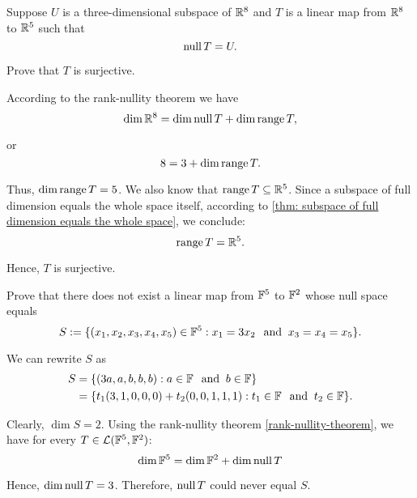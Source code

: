 \begin{xrcs}
  Suppose $U$ is a three-dimensional subspace of $\mathbb{R}^8$ and $T$ is a linear map from $\mathbb{R}^8$ to $\mathbb{R}^5$ such that
  \begin{equation}
    \operatorname{null} T = U.
  \end{equation}

  Prove that $T$ is surjective.

  \begin{xprf}
    According to the rank-nullity theorem we have
    \begin{equation}
        \dim \mathbb{R}^8 = \dim \operatorname{null} T + \dim \operatorname{range} T,
    \end{equation}

    or
    \begin{equation}
      8 = 3 + \dim \operatorname{range} T.
    \end{equation}

    Thus, $\dim \operatorname{range} T = 5$. We also know that $\operatorname{range} T \subseteq \mathbb{R}^5$. Since a subspace of full dimension equals the whole space itself, according to \ref{thm: subspace of full dimension equals the whole space}, we conclude:
    \begin{equation}
      \operatorname{range} T = \mathbb{R}^5.
    \end{equation}

    Hence, $T$ is surjective.
  \end{xprf}
\end{xrcs}

\begin{xrcs}
  Prove that there does not exist a linear map from $\mathbb{F}^5$ to  $\mathbb{F}^2$ whose null space equals
  \begin{equation}
    S := \{(x_1, x_2, x_3, x_4, x_5) \in \mathbb{F}^5 : x_1 = 3 x_2 \;\;\, \text{and}\;\; x_3 = x_4 = x_5 \}.
  \end{equation}

  \begin{xprf}
    We can rewrite $S$ as
    \begin{equation}
      \begin{aligned}
        S &= \{ ( 3a, a, b,b,b) : a \in \mathbb{F} \;\;\, \text{and}\;\; b \in \mathbb{F} \} \\
          &= \{ t_1 (3,1,0,0,0) + t_2 (0,0,1,1,1) :  t_1 \in \mathbb{F} \;\;\, \text{and}\;\; t_2 \in \mathbb{F} \}.
      \end{aligned}
    \end{equation}

    Clearly, $\dim S = 2$. Using the rank-nullity theorem \ref{rank-nullity-theorem}, we have for every $T \in \mathcal{L} (\mathbb{F}^5, \mathbb{F}^2)$:
    \begin{equation}
      \dim \mathbb{F}^5 = \dim \mathbb{F}^2 + \dim \operatorname{null} T  \\
    \end{equation}

    Hence, $\dim \operatorname{null} T = 3$. Therefore, $\operatorname{null} T$ could never equal $S$.
  \end{xprf}
\end{xrcs}

